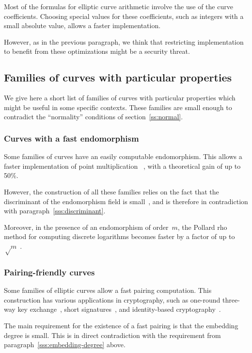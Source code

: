 \documentclass[twocolumn,letterpaper,10pt]{article}
\begin{document}
Most of the formulas for elliptic curve arithmetic
involve the use of the curve coefficients.
Choosing special values for these coefficients,
such as integers with a small absolute value,
allows a faster implementation.

However, as in the previous paragraph, we think that
restricting implementation to benefit from these optimizations
might be a security threat.

\subsection{Families of curves with particular properties}
\label{ss:particular}

We give here a short list of families of curves
with particular properties which might be useful in some specific contexts.
These families are small enough
to contradict the ``normality'' conditions of section~\ref{ss:normal}.

\subsubsection{Curves with a fast endomorphism}

Some families of curves have an easily computable endomorphism.
This allows a faster implementation of point multiplication%
~\cite{crypto2001glv,joc2011gls}, with a theoretical gain of up to 50\%.

However, the construction of all these families
relies on the fact that the discriminant
of the endomorphism field is small~\cite{asia2013smith},
and is therefore in contradiction with paragraph~\ref{sss:discriminant}.

Moreover, in the presence of an endomorphism of order~$m$,
the Pollard rho method for computing discrete logarithms
becomes faster by a factor of up to~$√m$~\cite{asia1999dgm,moc2000glv}.

\subsubsection{Pairing-friendly curves}
\label{sss:pairing}

Some families of elliptic curves allow a fast pairing computation.
This construction has various applications in cryptography,
such as one-round three-way key exchange~\cite{jc2004joux},
short signatures~\cite{jc2004bls},
and identity-based cryptography~\cite{crypto2001bf,el2002paterson}.

The main requirement for the existence of a fast pairing
is that the embedding degree is small.
This is in direct contradiction with
the requirement from paragraph~\ref{sss:embedding-degree} above.
\end{document}
